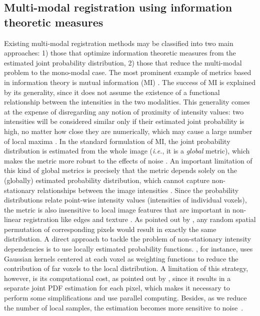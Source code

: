 \subsection{Multi-modal registration using information theoretic measures}
Existing multi-modal registration methods may be classified into two main approaches: 1) those that optimize information theoretic measures from the estimated joint probability distribution, 2) those that reduce the multi-modal problem to the mono-modal case. The most prominent example of metrics based in information theory is mutual information (MI) \citep{Maes1997, Mattes2003}. The success of MI is explained by its generality, since it does not assume the existence of a functional relationship between the intensities in the two modalities. This generality comes at the expense of disregarding any notion of proximity of intensity values: two intensities will be considered similar only if their estimated joint probability is high, no matter how close they are numerically, which may cause a large number of local maxima \citep[see][Fig. 2]{Roche1998}. In the standard formulation of MI, the joint probability distribution is estimated from the whole image ({\it i.e.}, it is a {\it global} metric), which makes the metric more robust to the effects of noise \citep{Mattes2003}. An important limitation of this kind of global metrics is precisely that the metric depends solely on the (globally) estimated probability distribution, which cannot capture non-stationary relationships between the image intensities \citep{Hermosillo2004}. Since the probability distributions relate point-wise intensity values (intensities of individual voxels), the metric is also insensitive to local image features that are important in non-linear registration like edges and texture \citep{Heinrich2012}. As pointed out by \cite{Sotiras2013}, any random spatial permutation of corresponding pixels would result in exactly the same distribution. A direct approach to tackle the problem of non-stationary intensity dependencies is to use locally estimated probability functions. \cite{Hermosillo2004}, for instance, uses Gaussian kernels centered at each voxel as weighting functions to reduce the contribution of far voxels to the local distribution. A limitation of this strategy, however, is its computational cost, as pointed out by \cite{Hermosillo2004}, since it results in a separate joint PDF estimation for each pixel, which makes it necessary to perform some simplifications and use parallel computing. Besides, as we reduce the number of local samples, the estimation becomes more sensitive to noise~\citep{Mattes2003}.

